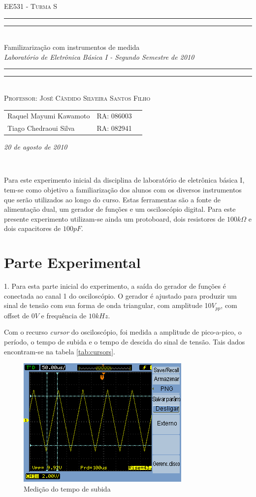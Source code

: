 \documentclass[a4paper]{article} %
\date{Agosto 20, 2010}
\newcommand*{\titleTMB}{\begingroup \centering \settowidth{\unitlength}{\LARGE EE531} {\large\scshape EE531 - Turma S}\\[0.2\baselineskip] \rule{11.0cm}{1.6pt}\vspace*{-\baselineskip}\vspace*{2pt} \rule{11.0cm}{0.4pt}\\[\baselineskip] {\LARGE  Familizarização com instrumentos de medida}\\\vspace*{\baselineskip}  {\itshape Laboratório de Eletrônica Básica I - Segundo Semestre de 2010}\\ \rule{11.0cm}{0.4pt}\vspace*{-\baselineskip}\vspace{3.2pt} \rule{11.0cm}{1.6pt}\\[\baselineskip] {\large\scshape Professor: José Cândido Silveira Santos Filho}\par \vfill {\normalsize   \scshape 
    \begin{center} 
      \begin{tabular}{  l  l  p{5cm} } 
        Raquel Mayumi Kawamoto & RA: 086003\\
        Tiago Chedraoui Silva  & RA: 082941\\
      \end{tabular} \end{center}
    \itshape 20 de agosto de 2010    }\\[\baselineskip] \vspace{3.2pt} \endgroup}
\begin{document}
\titleTMB 
\newpage



Para este experimento inicial da disciplina de laboratório de eletrônica básica I, tem-se como objetivo a familiarização dos alunos com os diversos instrumentos que serão utilizados ao longo do curso. Estas ferramentas são a fonte de alimentação dual, um gerador de funções e um osciloscópio digital. Para este presente experimento utilizam-se ainda um protoboard, dois resistores de 
$100k\Omega$ e dois capacitores de $100pF$. 
	

\section*{Parte Experimental}
1. Para esta parte inicial do experimento, a saída do gerador de funções é conectada ao canal 1 do osciloscópio. O gerador é ajustado para produzir um sinal de tensão com sua forma de onda triangular, com amplitude 10$V_{pp}$, com offset de $0V$ e frequência de $10kHz$. 
 
Com o recurso \textit{cursor} do osciloscópio, foi medida a amplitude de pico-a-pico, o período, o tempo de subida e o tempo de descida do sinal de tensão. Tais dados encontram-se na tabela \ref{tab:cursors}. 



\begin{figure}[h]
\begin{centering}
\includegraphics[scale=0.7]{Imagens/4122}\caption{Medição do tempo de subida \label{fig:Fig-4122}}
\par\end{centering}
\end{figure}
\end{document}
